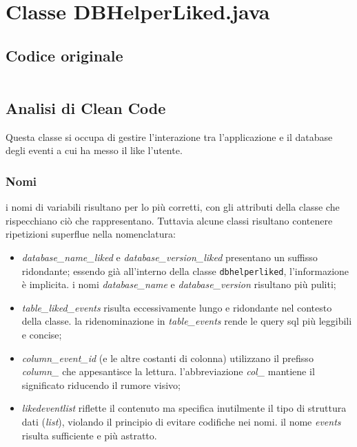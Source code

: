 \section{Classe DBHelperLiked.java}

\subsection{Codice originale}
\inputminted[linenos, frame=lines]{java}{../old/DBHelperLiked.java}

\subsection{Analisi di Clean Code}

Questa classe si occupa di gestire l'interazione tra l'applicazione e il database degli eventi a cui ha messo il like l'utente.

\subsubsection{Nomi}
i nomi di variabili risultano per lo più corretti, con gli attributi della classe che rispecchiano ciò che rappresentano. Tuttavia alcune classi risultano contenere ripetizioni superflue nella nomenclatura:
\begin{itemize}
    \item \textit{database\_name\_liked} e \textit{database\_version\_liked} presentano un suffisso ridondante; essendo già all'interno della classe \texttt{dbhelperliked}, l'informazione è implicita. i nomi \textit{database\_name} e \textit{database\_version} risultano più puliti;
    \item \textit{table\_liked\_events} risulta eccessivamente lungo e ridondante nel contesto della classe. la ridenominazione in \textit{table\_events} rende le query sql più leggibili e concise;
    \item \textit{column\_event\_id} (e le altre costanti di colonna) utilizzano il prefisso \textit{column\_} che appesantisce la lettura. l'abbreviazione \textit{col\_} mantiene il significato riducendo il rumore visivo;
    \item \textit{likedeventlist} riflette il contenuto ma specifica inutilmente il tipo di struttura dati (\textit{list}), violando il principio di evitare codifiche nei nomi. il nome \textit{events} risulta sufficiente e più astratto.
\end{itemize}

